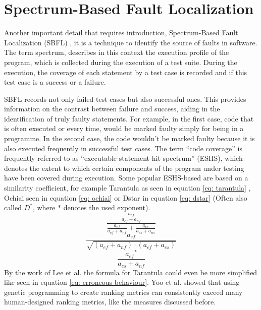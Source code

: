 \section{Spectrum-Based Fault Localization}\label{sec:spectrum-analysis}
Another important detail that requires introduction, Spectrum-Based Fault Localization (SBFL) \cite{wong_handbook_2023}, it is a technique to identify the source of faults in software.
The term spectrum, describes in this context the execution profile of the program, which is collected during the execution of a test suite.
During the execution, the coverage of each statement by a test case is recorded and if this test case is a success or a failure.

SBFL records not only failed test cases but also successful ones.
This provides information on the contrast between failure and success, aiding in the identification of truly faulty statements.
For example, in the first case, code that is often executed or every time, would be marked faulty simply for being in a programme.
In the second case, the code wouldn't be marked faulty because it is also executed frequently in successful test cases.
The term “code coverage” is frequently referred to as “executable statement hit spectrum” (ESHS), which denotes the extent to which certain components of the program under testing have been covered during execution.
Some popular ESHS-based are based on a similarity coefficient, for example Tarantula \cite{jones_empirical_2005} as seen in equation \ref{eq: tarantula} , Ochiai \cite{ochiai_zoogeographical_1957} seen in equation \ref{eq: ochiai} or Dstar \cite{wong_dstar_2014} in equation \ref{eq: dstar} (Often also called $D^*$, where $*$ denotes the used exponent).
\begin{equation}
    \frac{\frac{a_{ef}}{a_{ef} + a_{nf}}}{\frac{a_{ef}}{a_{ef} + a_{nf}}+\frac{a_{es}}{a_{es} + a_{ns}}}
    \label{eq: tarantula}
\end{equation}
\begin{equation}
    \frac{a_{ef}}{\sqrt{(a_{ef}+a_{nf})\cdot(a_{ef}+a_{es})}}
    \label{eq: ochiai}
\end{equation}
\begin{equation}
    \frac{{a_{ef}}^*}{a_{es}+a_{nf}}
    \label{eq: dstar}
\end{equation}
By the work of Lee et al. \cite{hua_jie_lee_study_2009} the formula for Tarantula could even be more simplified like seen in equation \ref{eq: erroneous behaviour}.
Yoo et al. \cite{yoo_human_2017} showed that using genetic programming to create ranking metrics can consistently exceed many human-designed ranking metrics, like the measures discussed before.

